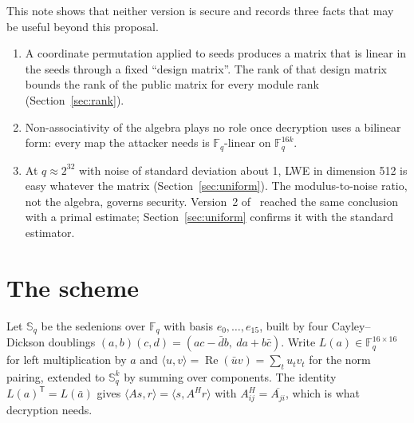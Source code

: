 \documentclass[11pt]{article}
\theoremstyle{remark}
\newcommand{\F}{\mathbb{F}}
\newcommand{\Sed}{\mathbb{S}}
\DeclareMathOperator{\re}{Re}
\begin{document}
This note shows that neither version is secure and records three facts that may be useful beyond this proposal.
\begin{enumerate}
\item A coordinate permutation applied to seeds produces a matrix that is linear in the seeds through a fixed
  ``design matrix''. The rank of that design matrix bounds the rank of the public matrix for every module rank
  (Section~\ref{sec:rank}).
\item Non-associativity of the algebra plays no role once decryption uses a bilinear form: every map the attacker needs
  is $\F_q$-linear on $\F_q^{16k}$.
\item At $q\approx2^{32}$ with noise of standard deviation about 1, LWE in dimension 512 is easy whatever the matrix
  (Section~\ref{sec:uniform}). The modulus-to-noise ratio, not the algebra, governs security. Version~2
  of~\cite{Gif26a} reached the same conclusion with a primal estimate; Section~\ref{sec:uniform} confirms it with the
  standard estimator.
\end{enumerate}

\section{The scheme}\label{sec:scheme}

Let $\Sed_q$ be the sedenions over $\F_q$ with basis $e_0,\dots,e_{15}$, built by four Cayley--Dickson doublings
$(a,b)(c,d)=(ac-\bar d b,\ da+b\bar c)$. Write $L(a)\in\F_q^{16\times16}$ for left multiplication by $a$ and
$\langle u,v\rangle=\re(\bar u v)=\sum_t u_t v_t$ for the norm pairing, extended to $\Sed_q^k$ by summing over
components. The identity $L(a)^{\mathsf T}=L(\bar a)$ gives $\langle A s,r\rangle=\langle s,A^{H}r\rangle$ with
$A^{H}_{ij}=\overline{A_{ji}}$, which is what decryption needs.
\end{document}

